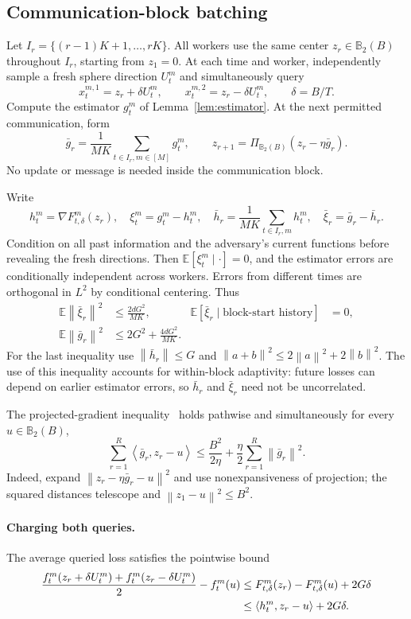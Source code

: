 \documentclass[11pt,a4paper]{article}
\numberwithin{equation}{section}
\theoremstyle{remark}
\newcommand{\E}{\mathbb E}
\newcommand{\norm}[1]{\left\lVert #1\right\rVert}
\newcommand{\ip}[2]{\left\langle #1,#2\right\rangle}
\newcommand{\B}{\mathbb B_2}
\begin{document}
\subsection{Communication-block batching}

Let $I_r=\{(r-1)K+1,\ldots,rK\}$. All workers use the same center
$z_r\in\B(B)$ throughout $I_r$, starting from $z_1=0$. At each time and
worker, independently sample a fresh sphere direction $U_t^m$ and
simultaneously query
\[
 x_t^{m,1}=z_r+\delta U_t^m,\qquad
 x_t^{m,2}=z_r-\delta U_t^m,
 \qquad \delta=B/T.
\]
Compute the estimator $g_t^m$ of Lemma~\ref{lem:estimator}. At the next
permitted communication, form
\[
 \bar g_r=\frac1{MK}\sum_{t\in I_r,m\in[M]}g_t^m,
 \qquad
 z_{r+1}=\Pi_{\B(B)}(z_r-\eta\bar g_r).
\]
No update or message is needed inside the communication block.

Write
\[
 h_t^m=\nabla F_{t,\delta}^m(z_r),\quad
 \xi_t^m=g_t^m-h_t^m,\quad
 \bar h_r=\frac1{MK}\sum_{t\in I_r,m}h_t^m,\quad
 \bar\xi_r=\bar g_r-\bar h_r.
\]
Condition on all past information and the adversary's current functions
before revealing the fresh directions. Then $\E[\xi_t^m\mid\cdot]=0$,
and the estimator errors are conditionally independent across workers.
Errors from different times are orthogonal in $L^2$ by conditional
centering. Thus
\begin{align}
 \E\norm{\bar\xi_r}^2&\le\frac{2dG^2}{MK},&
 \E[\bar\xi_r\mid\text{block-start history}]&=0, \label{eq:block-noise}\\
 \E\norm{\bar g_r}^2
 &\le2G^2+\frac{4dG^2}{MK}.                 \label{eq:block-moment}
\end{align}
For the last inequality use $\norm{\bar h_r}\le G$ and
$\norm{a+b}^2\le2\norm a^2+2\norm b^2$.
The use of this inequality accounts for within-block adaptivity: future losses can depend on earlier estimator errors, so $\bar h_r$ and $\bar\xi_r$ need not be uncorrelated.

The projected-gradient inequality~\cite{Zinkevich03} holds pathwise and simultaneously for every
$u\in\B(B)$,
\begin{equation}
 \sum_{r=1}^R\ip{\bar g_r}{z_r-u}
 \le \frac{B^2}{2\eta}+\frac\eta2
          \sum_{r=1}^R\norm{\bar g_r}^2.    \label{eq:ogd}
\end{equation}
Indeed, expand
$\norm{z_r-\eta\bar g_r-u}^2$ and use nonexpansiveness of projection;
the squared distances telescope and $\norm{z_1-u}^2\le B^2$.

\paragraph{Charging both queries.}
The average queried loss satisfies the pointwise bound
\begin{align}
 \frac{f_t^m(z_r+\delta U_t^m)+f_t^m(z_r-\delta U_t^m)}2-f_t^m(u)
 &\le F_{t,\delta}^m(z_r)-F_{t,\delta}^m(u)+2G\delta \notag\\
 &\le \ip{h_t^m}{z_r-u}+2G\delta.         \label{eq:charged}
\end{align}
\end{document}
